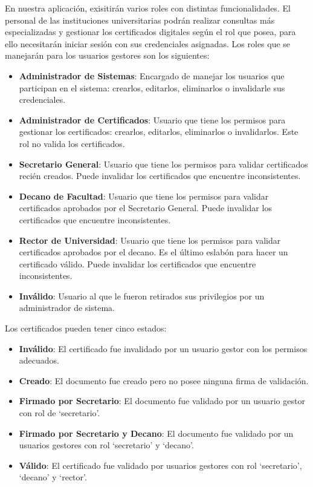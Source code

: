 En nuestra aplicación, exisitirán varios roles con distintas funcionalidades. El personal de las instituciones universitarias podrán realizar consultas más especializadas y gestionar los certificados digitales según el rol que posea, para ello necesitarán iniciar sesión con sus credenciales asignadas. Los roles que se manejarán para los usuarios gestores son los siguientes:

\begin{itemize}
\item \textbf{Administrador de Sistemas}: Encargado de manejar los usuarios que participan en el sistema: crearlos, editarlos, eliminarlos o invalidarle sus credenciales.
\item \textbf{Administrador de Certificados}: Usuario que tiene los permisos para gestionar los certificados: crearlos, editarlos, eliminarlos o invalidarlos. Este rol no valida los certificados.
\item \textbf{Secretario General}: Usuario que tiene los permisos para validar certificados recién creados. Puede invalidar los certificados que encuentre inconsistentes.
\item \textbf{Decano de Facultad}: Usuario que tiene los permisos para validar certificados aprobados por el Secretario General. Puede invalidar los certificados que encuentre inconsistentes.
\item \textbf{Rector de Universidad}: Usuario que tiene los permisos para validar certificados aprobados por el decano. Es el último eslabón para hacer un certificado válido. Puede invalidar los certificados que encuentre inconsistentes.
\item \textbf{Inválido}: Usuario al que le fueron retirados sus privilegios por un administrador de sistema.
\end{itemize}

Los certificados pueden tener cinco estados:
\begin{itemize}
\item \textbf{Inválido}: El certificado fue invalidado por un usuario gestor con los permisos adecuados.
\item \textbf{Creado}: El documento fue creado pero no posee ninguna firma de validación.
\item \textbf{Firmado por Secretario}: El documento fue validado por un usuario gestor con rol de `secretario'.
\item \textbf{Firmado por Secretario y Decano}: El documento fue validado por un usuarios gestores con rol `secretario' y `decano'.
\item \textbf{Válido}: El certificado fue validado por usuarios gestores con rol `secretario', `decano' y `rector'.
\end{itemize}

